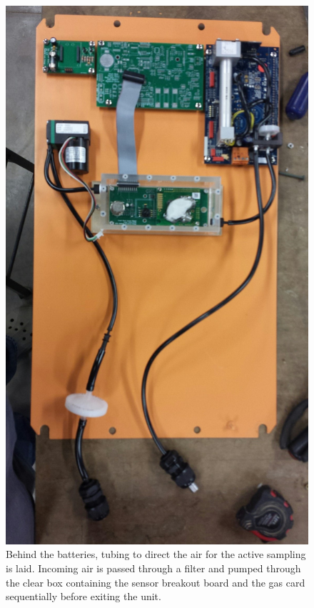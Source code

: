 \documentclass[journal]{IEEEtran}
\begin{document}
\begin{figure}
		\centering
		\includegraphics[width=\columnwidth,keepaspectratio]{commbuild2.jpg}
		\caption[Layout of board in communication nodes]{Behind the batteries, tubing to direct the air for the active sampling is laid.  Incoming air is passed through a filter and pumped through the clear box containing the sensor breakout board and the gas card sequentially before exiting the unit.\label{fig:commbuild2}}
\end{figure}	
\end{document}
